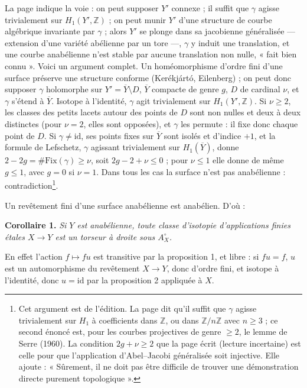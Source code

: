 \documentclass[11pt,a4paper]{article}
\begin{document}
La page indique la voie : on peut supposer $Y'$ connexe ; il suffit que
$\gamma$ agisse trivialement sur $H_1(Y', \mathbb{Z})$ ; on peut munir $Y'$
d'une structure de courbe algébrique invariante par $\gamma$ ; alors $Y'$ se
plonge dans sa jacobienne généralisée — extension d'une variété abélienne par
un tore —, $\gamma$ y induit une translation, et une courbe anabélienne n'est
stable par aucune translation non nulle, « fait bien connu ». Voici un
argument complet. Un homéomorphisme d'ordre fini d'une surface préserve une
structure conforme (Kerékjártó, Eilenberg) ; on peut donc supposer $\gamma$
holomorphe sur $Y' = \overline{Y} \setminus D$, $\overline{Y}$ compacte de
genre $g$, $D$ de cardinal $\nu$, et $\gamma$ s'étend à $\overline{Y}$.
Isotope à l'identité, $\gamma$ agit trivialement sur $H_1(Y', \mathbb{Z})$.
Si $\nu \geq 2$, les classes des petits lacets autour des points de $D$ sont
non nulles et deux à deux distinctes (pour $\nu = 2$, elles sont opposées),
et $\gamma$ les permute : il fixe donc chaque point de $D$. Si $\gamma \neq
\mathrm{id}$, ses points fixes sur $\overline{Y}$ sont isolés et d'indice $+1$,
et la formule de Lefschetz, $\gamma$ agissant trivialement sur
$H_1(\overline{Y})$, donne $2 - 2g = \#\mathrm{Fix}(\gamma) \geq \nu$, soit
$2g - 2 + \nu \leq 0$ ; pour $\nu \leq 1$ elle donne de même $g \leq 1$, avec
$g = 0$ si $\nu = 1$. Dans tous les cas la surface n'est pas anabélienne :
contradiction\footnote{Cet argument est de l'édition. La page dit qu'il suffit
que $\gamma$ agisse trivialement sur $H_1$ à coefficients dans $\mathbb{Z}$,
ou dans $\mathbb{Z}/n\mathbb{Z}$ avec $n \geq 3$ ; ce second énoncé est, pour
les courbes projectives de genre $\geq 2$, le lemme de Serre (1960). La
condition $2g + \nu \geq 2$ que la page écrit (lecture incertaine) est celle
pour que l'application d'Abel–Jacobi généralisée soit injective. Elle ajoute :
« Sûrement, il ne doit pas être difficile de trouver une démonstration directe
purement topologique ».}.

Un revêtement fini d'une surface anabélienne est anabélien. D'où :

\textbf{Corollaire 1.} \emph{Si $Y$ est anabélienne, toute classe d'isotopie
d'applications finies étales $X \to Y$ est un torseur à droite sous
$A^{\circ}_X$.}

En effet l'action $f \mapsto f u$ est transitive par la proposition 1, et
libre : si $f u = f$, $u$ est un automorphisme du revêtement $X \to Y$, donc
d'ordre fini, et isotope à l'identité, donc $u = \mathrm{id}$ par la
proposition 2 appliquée à $X$.
\end{document}

